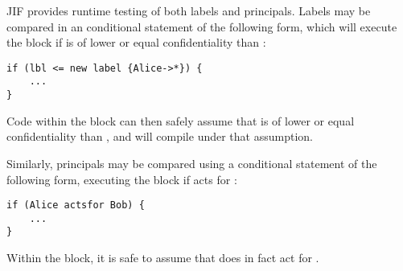 JIF provides runtime testing of both labels and principals. Labels may be compared in an conditional statement of the following form, which will execute the block if  is of lower or equal confidentiality than :

\begin{verbatim}
if (lbl <= new label {Alice->*}) {
	...
}
\end{verbatim}

Code within the block can then safely assume that  is of lower or equal confidentiality than , and will compile under that assumption.

Similarly, principals may be compared using a conditional statement of the following form, executing the block if  acts for :

\begin{verbatim}
if (Alice actsfor Bob) {
	...
}
\end{verbatim}

Within the block, it is safe to assume that  does in fact act for .